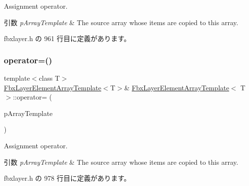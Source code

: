 Assignment operator. 
\begin{DoxyParams}{引数}
{\em p\+Array\+Template} & The source array whose items are copied to this array. \\
\hline
\end{DoxyParams}


 fbxlayer.\+h の 961 行目に定義があります。

\mbox{\label{class_fbx_layer_element_array_template_a97ad38fd116a2f9ac06d04748e4601b0}} 
\subsubsection{\texorpdfstring{operator=()}{operator=()}\hspace{0.1cm}{\footnotesize\ttfamily [2/2]}}
{\footnotesize\ttfamily template$<$class T$>$ \\
\hyperlink{class_fbx_layer_element_array_template}{Fbx\+Layer\+Element\+Array\+Template}$<$T$>$\& \hyperlink{class_fbx_layer_element_array_template}{Fbx\+Layer\+Element\+Array\+Template}$<$ T $>$\+::operator= (\begin{DoxyParamCaption}\item[{const \hyperlink{class_fbx_layer_element_array_template}{Fbx\+Layer\+Element\+Array\+Template}$<$ T $>$ \&}]{p\+Array\+Template }\end{DoxyParamCaption})\hspace{0.3cm}{\ttfamily [inline]}}

Assignment operator. 
\begin{DoxyParams}{引数}
{\em p\+Array\+Template} & The source array whose items are copied to this array. \\
\hline
\end{DoxyParams}


 fbxlayer.\+h の 978 行目に定義があります。

\mbox{\label{class_fbx_layer_element_array_template_a1307ade46b3db83ed5cec97e2449f0de}} 
